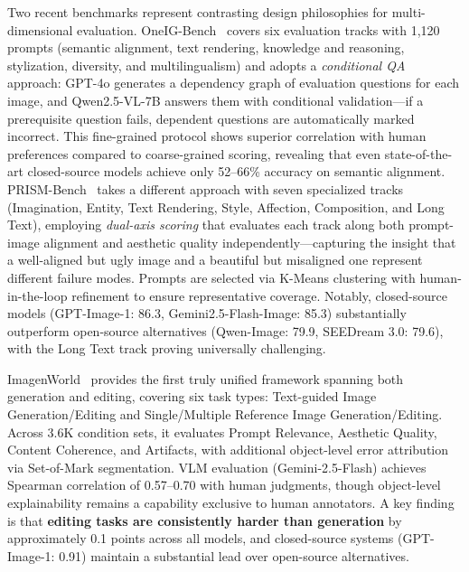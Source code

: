 Two recent benchmarks represent contrasting design philosophies for multi-dimensional evaluation. OneIG-Bench~\citep{OneIG-Bench} covers six evaluation tracks with 1,120 prompts (semantic alignment, text rendering, knowledge and reasoning, stylization, diversity, and multilingualism) and adopts a \emph{conditional QA} approach: GPT-4o generates a dependency graph of evaluation questions for each image, and Qwen2.5-VL-7B answers them with conditional validation---if a prerequisite question fails, dependent questions are automatically marked incorrect. This fine-grained protocol shows superior correlation with human preferences compared to coarse-grained scoring, revealing that even state-of-the-art closed-source models achieve only 52--66\% accuracy on semantic alignment. PRISM-Bench~\citep{FLUX-Reason-6M_PRISM-Bench} takes a different approach with seven specialized tracks (Imagination, Entity, Text Rendering, Style, Affection, Composition, and Long Text), employing \emph{dual-axis scoring} that evaluates each track along both prompt-image alignment and aesthetic quality independently---capturing the insight that a well-aligned but ugly image and a beautiful but misaligned one represent different failure modes. Prompts are selected via K-Means clustering with human-in-the-loop refinement to ensure representative coverage. Notably, closed-source models (GPT-Image-1: 86.3, Gemini2.5-Flash-Image: 85.3) substantially outperform open-source alternatives (Qwen-Image: 79.9, SEEDream 3.0: 79.6), with the Long Text track proving universally challenging.

ImagenWorld~\citep{ImagenWorld} provides the first truly unified framework spanning both generation and editing, covering six task types: Text-guided Image Generation/Editing and Single/Multiple Reference Image Generation/Editing. Across 3.6K condition sets, it evaluates Prompt Relevance, Aesthetic Quality, Content Coherence, and Artifacts, with additional object-level error attribution via Set-of-Mark segmentation. VLM evaluation (Gemini-2.5-Flash) achieves Spearman correlation of 0.57--0.70 with human judgments, though object-level explainability remains a capability exclusive to human annotators. A key finding is that \textbf{editing tasks are consistently harder than generation} by approximately 0.1 points across all models, and closed-source systems (GPT-Image-1: 0.91) maintain a substantial lead over open-source alternatives.

